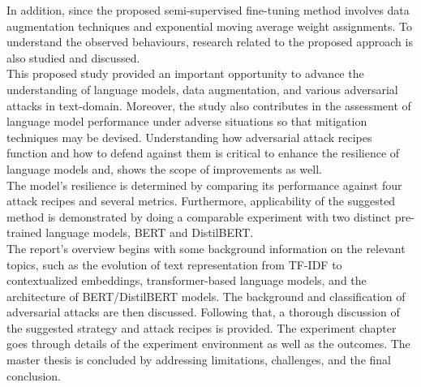 \documentclass[%
	BCOR=8mm, %
	DIV=12,
	toc=bibliography, %
	toc=listof, %
	oneside, %
	egregdoesnotlikesansseriftitles, %
	]{scrbook}
\begin{document}
In addition, since the proposed semi-supervised fine-tuning method involves data augmentation techniques and exponential moving average weight assignments. To understand the observed behaviours, research related to the proposed approach is also studied and discussed.\\
This proposed study provided an important opportunity to advance the understanding of language models, data augmentation, and various adversarial attacks in text-domain. Moreover, the study also contributes in the assessment of language model performance under adverse situations so that mitigation techniques may be devised. Understanding how adversarial attack recipes function and how to defend against them is critical to enhance the resilience of language models and, shows the scope of improvements as well. \\
The model's resilience is determined by comparing its performance against four attack recipes and several metrics. Furthermore, applicability of the suggested method is demonstrated by doing a comparable experiment with two distinct pre-trained language models, BERT and DistilBERT.\\
The report's overview begins with some background information on the relevant topics, such as the evolution of text representation from TF-IDF to contextualized embeddings, transformer-based language models, and the architecture of BERT/DistilBERT models. The background and classification of adversarial attacks are then discussed. Following that, a thorough discussion of the suggested strategy and attack recipes is provided. The experiment chapter goes through details of the experiment environment as well as the outcomes. The master thesis is concluded by addressing limitations, challenges, and the final conclusion.


\end{document}
